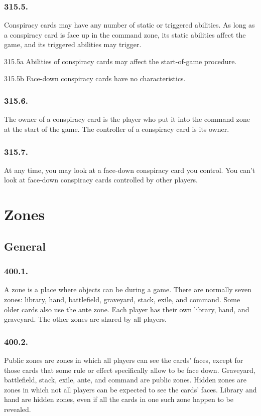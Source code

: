 \subsection*{315.5.}
Conspiracy cards may have any number of static or triggered abilities. As long as a conspiracy card is face up in the command zone, its static abilities affect the game, and its triggered abilities may trigger.

315.5a Abilities of conspiracy cards may affect the start-of-game procedure.

315.5b Face-down conspiracy cards have no characteristics.

\subsection*{315.6.}
The owner of a conspiracy card is the player who put it into the command zone at the start of the game. The controller of a conspiracy card is its owner.

\subsection*{315.7.}
At any time, you may look at a face-down conspiracy card you control. You can’t look at face-down conspiracy cards controlled by other players.

\chapter{Zones}
\setcounter{section}{399}
\section{General}
\subsection*{400.1.}
A zone is a place where objects can be during a game. There are normally seven zones: library, hand, battlefield, graveyard, stack, exile, and command. Some older cards also use the ante zone. Each player has their own library, hand, and graveyard. The other zones are shared by all players.

\subsection*{400.2.}
Public zones are zones in which all players can see the cards’ faces, except for those cards that some rule or effect specifically allow to be face down. Graveyard, battlefield, stack, exile, ante, and command are public zones. Hidden zones are zones in which not all players can be expected to see the cards’ faces. Library and hand are hidden zones, even if all the cards in one such zone happen to be revealed.

